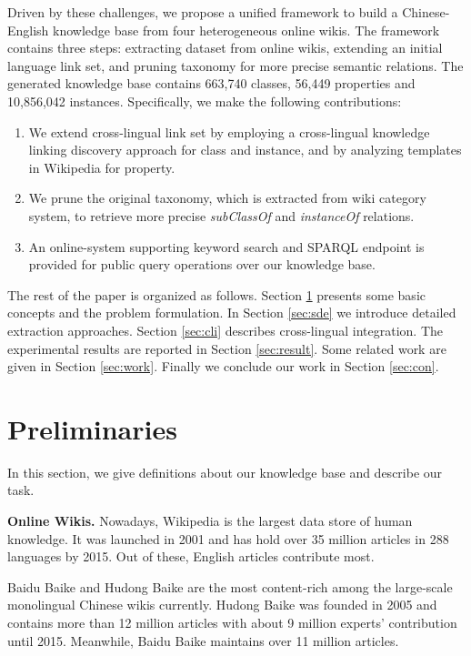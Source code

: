 \documentclass[runningheads,a4paper]{llncs}
\newcommand{\para}[1]{\vspace{0.1cm}\noindent\textbf{#1}}
\begin{document}
Driven by these challenges, we propose a unified framework to build a Chinese-English knowledge base from four heterogeneous online wikis. The framework contains three steps: extracting dataset from online wikis, extending an initial language link set, and pruning taxonomy for more precise semantic relations. The generated knowledge base contains 663,740 classes, 56,449 properties and 10,856,042 instances. Specifically, we make the following contributions:
\begin{enumerate}
  \item We extend cross-lingual link set by employing a cross-lingual knowledge linking discovery approach for class and instance, and by analyzing templates in Wikipedia for property.
  \item We prune the original taxonomy, which is extracted from wiki category system, to retrieve more precise \textit{subClassOf} and \textit{instanceOf} relations.
  \item An online-system supporting keyword search and SPARQL endpoint is provided for public query operations over our knowledge base.
\end{enumerate}

The rest of the paper is organized as follows. Section \ref{sec:pd} presents some basic concepts and the problem formulation. In Section \ref{sec:sde} we introduce detailed extraction approaches. Section \ref{sec:cli} describes cross-lingual integration. The experimental results are reported in Section \ref{sec:result}. Some related work are given in Section \ref{sec:work}. Finally we conclude our work in Section \ref{sec:con}.

\section{Preliminaries}
\label{sec:pd}
In this section, we give definitions about our knowledge base and describe our task.

\para{Online Wikis.} Nowadays, Wikipedia is the largest data store of human knowledge. It was launched in 2001 and has hold over 35 million articles in 288 languages by 2015. Out of these, English articles contribute most. 

Baidu Baike and Hudong Baike are the most content-rich among the large-scale monolingual Chinese wikis currently. Hudong Baike was founded in 2005 and contains more than 12 million articles with about 9 million experts' contribution until 2015. Meanwhile, Baidu Baike maintains over 11 million articles.
\end{document}
